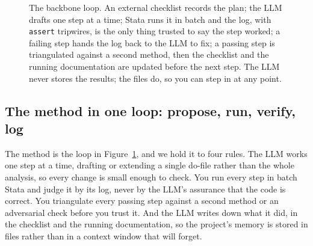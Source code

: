 \documentclass[
    a4paper,
    fontsize=10pt,
    twoside=true,
    numbers=noenddot,
]{kaobook}
\begin{document}
\begin{figure}[htbp]
\centering
{}
\caption[The backbone loop]{The backbone loop. An external checklist records the plan; the LLM drafts one step at a time; Stata runs it in batch and the log, with \texttt{assert} tripwires, is the only thing trusted to say the step worked; a failing step hands the log back to the LLM to fix; a passing step is triangulated against a second method, then the checklist and the running documentation are updated before the next step. The LLM never stores the results; the files do, so you can step in at any point.}
\label{fig:backbone}
\end{figure}

\subsection{The method in one loop: propose, run, verify, log}
The method is the loop in Figure~\ref{fig:backbone}, and we hold it to four rules. The LLM works one step at a time, drafting or extending a single do-file rather than the whole analysis, so every change is small enough to check. You run every step in batch Stata and judge it by its log, never by the LLM's assurance that the code is correct. You triangulate every passing step against a second method or an adversarial check before you trust it. And the LLM writes down what it did, in the checklist and the running documentation, so the project's memory is stored in files rather than in a context window that will forget.
\end{document}
